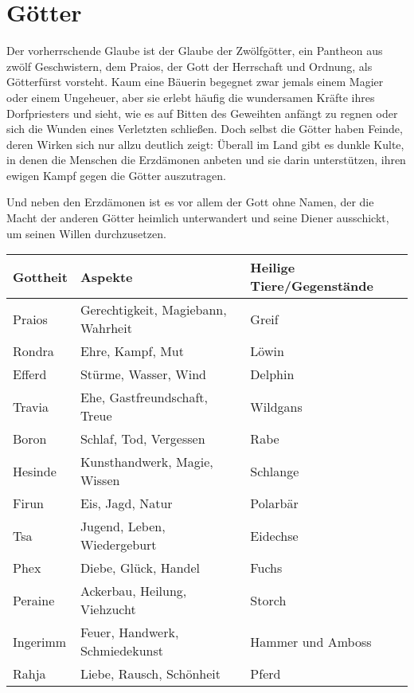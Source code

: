 \documentclass[../../Heldenanleitung2]{subfiles}
\begin{document}
\chapter{Götter}
Der vorherrschende Glaube ist der Glaube der Zwölfgötter, ein
Pantheon aus zwölf Geschwistern, dem Praios, der Gott
der Herrschaft und Ordnung, als Götterfürst vorsteht.
Kaum eine Bäuerin begegnet zwar jemals einem Magier
oder einem Ungeheuer, aber sie erlebt häufig die
wundersamen Kräfte ihres Dorfpriesters und sieht, wie
es auf Bitten des Geweihten anfängt zu regnen oder sich
die Wunden eines Verletzten schließen.
Doch selbst die Götter haben Feinde, deren Wirken
sich nur allzu deutlich zeigt: Überall im Land gibt es dunkle Kulte, in denen die Menschen die Erzdämonen anbeten und sie darin
unterstützen, ihren ewigen Kampf gegen die Götter
auszutragen.

Und neben den Erzdämonen ist es vor allem der Gott
ohne Namen, der die Macht der anderen Götter
heimlich unterwandert und seine Diener ausschickt,
um seinen Willen durchzusetzen.
\renewcommand{\arraystretch}{1.5}
{
\begin{table}[h!]
\centering
\begin{tabular}{|l|l|l|}
\hline
\textbf{Gottheit} & \textbf{Aspekte} & \textbf{Heilige Tiere/Gegenstände}\\
\hline
Praios & Gerechtigkeit, Magiebann, Wahrheit & Greif\\
Rondra & Ehre, Kampf, Mut & Löwin\\
Efferd & Stürme, Wasser, Wind & Delphin\\
Travia & Ehe, Gastfreundschaft, Treue & Wildgans\\
Boron & Schlaf, Tod, Vergessen & Rabe \\
Hesinde & Kunsthandwerk, Magie, Wissen & Schlange\\
Firun & Eis, Jagd, Natur & Polarbär\\
Tsa & Jugend, Leben, Wiedergeburt & Eidechse\\
Phex & Diebe, Glück, Handel & Fuchs\\
Peraine & Ackerbau, Heilung, Viehzucht & Storch\\
Ingerimm & Feuer, Handwerk, Schmiedekunst & Hammer und Amboss\\
Rahja & Liebe, Rausch, Schönheit & Pferd\\
\hline
\end{tabular}
\end{table}
}
\end{document}
